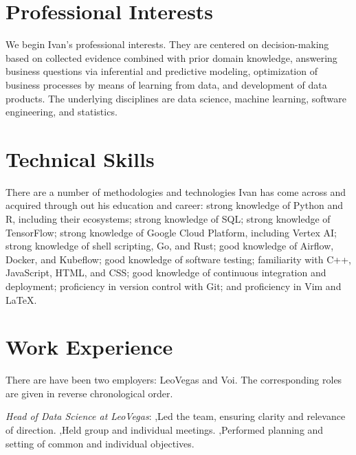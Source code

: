 \documentclass[journal]{IEEEtran}
\begin{document}
\section{Professional Interests} 

We begin Ivan's professional interests. They are centered on decision-making
based on collected evidence combined with prior domain knowledge, answering
business questions via inferential and predictive modeling, optimization of
business processes by means of learning from data, and development of data
products. The underlying disciplines are data science, machine learning,
software engineering, and statistics.

\section{Technical Skills} 

There are a number of methodologies and technologies Ivan has come across and
acquired through out his education and career: strong knowledge of Python and R,
including their ecosystems; strong knowledge of SQL; strong knowledge of
TensorFlow; strong knowledge of Google Cloud Platform, including Vertex AI;
strong knowledge of shell scripting, Go, and Rust; good knowledge of Airflow,
Docker, and Kubeflow; good knowledge of software testing; familiarity with C++,
JavaScript, HTML, and CSS; good knowledge of continuous integration and
deployment; proficiency in version control with Git; and proficiency in Vim and
LaTeX.

\section{Work Experience} 

There are have been two employers: LeoVegas and Voi. The corresponding roles are
given in reverse chronological order.

\date{November 2019--February 2022} \emph{Head of Data Science at LeoVegas}:
\sep Led the team, ensuring clarity and relevance of direction. \sep Held group
and individual meetings. \sep Performed planning and setting of common and
individual objectives.
\end{document}
